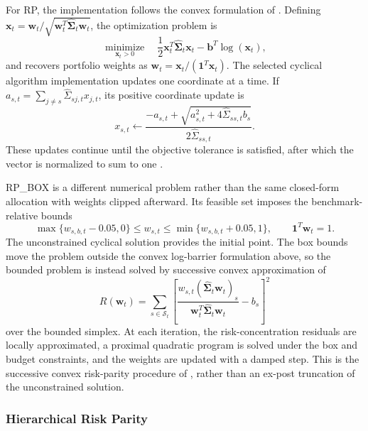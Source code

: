 \documentclass[preprint,12pt,authoryear]{elsarticle}
\begin{document}
\begin{appendices}
For RP, the implementation follows the convex formulation of \citet{spinu2013}. Defining
$\mathbf{x}_{t}=\mathbf{w}_{t}/
\sqrt{\mathbf{w}_{t}^{T}\widehat{\boldsymbol{\Sigma}}_{t}\mathbf{w}_{t}}$,
the optimization problem is
\begin{equation}
\underset{\mathbf{x}_{t}>0}{\operatorname{minimize}}\quad
\frac{1}{2}\mathbf{x}_{t}^{T}\widehat{\boldsymbol{\Sigma}}_{t}\mathbf{x}_{t}
-\mathbf{b}^{T}\log(\mathbf{x}_{t}),
\end{equation}
and recovers portfolio weights as
$\mathbf{w}_{t}=\mathbf{x}_{t}/(\mathbf{1}^{T}\mathbf{x}_{t})$.
The selected cyclical algorithm implementation updates one coordinate at a time. If
$a_{s,t}=\sum_{j\neq s}\widehat{\Sigma}_{sj,t}x_{j,t}$, its positive coordinate update is
\begin{equation}
x_{s,t}\leftarrow
\frac{-a_{s,t}+
\sqrt{a_{s,t}^{2}+4\widehat{\Sigma}_{ss,t}b_s}}
{2\widehat{\Sigma}_{ss,t}}.
\end{equation}
These updates continue until the objective tolerance is satisfied, after which the vector is normalized to sum to one \citep{spinu2013}.

RP\_BOX is a different numerical problem rather than the same closed-form allocation with weights clipped afterward. Its feasible set imposes the benchmark-relative bounds
\begin{equation}
\max\{w_{s,b,t}-0.05,0\}\leq w_{s,t}\leq
\min\{w_{s,b,t}+0.05,1\},
\qquad \mathbf{1}^{T}\mathbf{w}_{t}=1.
\end{equation}
The unconstrained cyclical solution provides the initial point. The box bounds move the problem outside the convex log-barrier formulation above, so the bounded problem is instead solved by successive convex approximation of
\begin{equation}
R(\mathbf{w}_{t})=
\sum_{s\in\mathcal{S}_{t}}
\left[
\frac{w_{s,t}
\left(\widehat{\boldsymbol{\Sigma}}_{t}\mathbf{w}_{t}\right)_{s}}
{\mathbf{w}_{t}^{T}\widehat{\boldsymbol{\Sigma}}_{t}\mathbf{w}_{t}}
-b_s
\right]^2
\end{equation}
over the bounded simplex. At each iteration, the risk-concentration residuals are locally approximated, a proximal quadratic program is solved under the box and budget constraints, and the weights are updated with a damped step. This is the successive convex risk-parity procedure of \citet{fengpalomar2015}, rather than an ex-post truncation of the unconstrained solution.

\subsubsection{Hierarchical Risk Parity}


\end{appendices}
\end{document}
